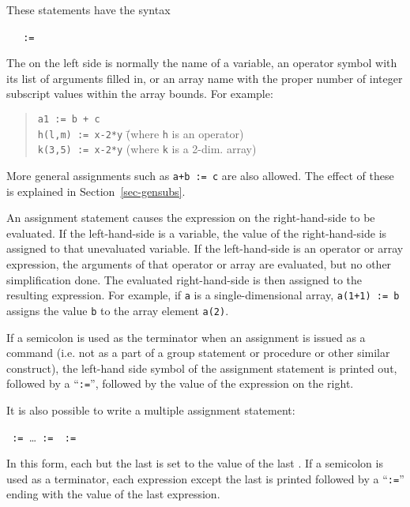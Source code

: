\label{reserved:assignop}

These statements
 have the syntax
\begin{syntax}
  \ \BNFprod\ \texttt{ := }
\end{syntax}
The  on the left side is normally the name of a variable, an
operator symbol with its list of arguments filled in, or an array name with
the proper number of integer subscript values within the array bounds. For
example:
\begin{quote}
\begin{tabbing}
\texttt{a1 := b + c} \\
\texttt{h(l,m) := x-2*y} \hspace{1in} \= (where \texttt{h} is an operator) \\
\texttt{k(3,5) := x-2*y} \> (where \texttt{k} is a 2-dim. array)
\end{tabbing}
\end{quote}
More general assignments such as \texttt{a+b := c} are also
allowed.  The effect of these is explained in Section~\ref{sec-gensubs}.

An assignment statement causes the expression on the right-hand-side to be
evaluated.  If the left-hand-side is a variable, the value of the
right-hand-side is assigned to that unevaluated variable.  If the
left-hand-side is an operator or array expression, the arguments of that
operator or array are evaluated, but no other simplification done.  The
evaluated right-hand-side is then assigned to the resulting expression.
For example, if \texttt{a} is a single-dimensional array, \texttt{a(1+1) := b}
assigns the value \texttt{b} to the array element \texttt{a(2)}.

If a semicolon is used as the terminator when an assignment
 is issued as a command (i.e. not as a part of a group
statement or procedure or other similar construct), the left-hand side
symbol of the assignment statement is printed out, followed by a
``\texttt{:=}'', followed by the value of the expression on the right.

It is also possible to write a multiple assignment statement:
\begin{syntax}
  \texttt{ := }\dots\texttt{ :=
  }\texttt{ := }
\end{syntax}
In this form, each  but the last is set to the value of
the last .  If a semicolon is used as a terminator, each
expression except the last is printed followed by a ``\texttt{:=}'' ending
with the value of the last expression.


